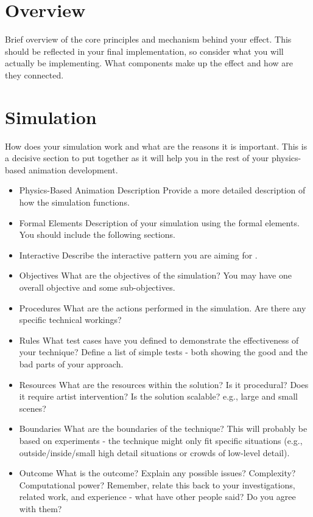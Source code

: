 \documentclass[conference]{acmsiggraph}
\begin{document}
\section{Overview}
Brief overview of the core principles and mechanism behind your effect.  This should be reflected in your final implementation, so consider what you will actually be implementing. What components make up the effect and how are they connected.


\section{Simulation}

How does your simulation work and what are the reasons it is important.  This is a decisive section to put together as it will help you in the rest of your physics-based animation development.

\begin{itemize}
\item{Physics-Based Animation Description}
Provide a more detailed description of how the simulation functions.
\item{Formal Elements}
Description of your simulation using the formal elements.  You should include the following sections.
\item{Interactive}
Describe the interactive pattern you are aiming for .
\item{Objectives}
What are the objectives of the simulation?  You may have one overall objective and some sub-objectives.
\item{Procedures}
What are the actions performed in the simulation.  Are there any specific technical workings?
\item{Rules}
What test cases have you defined to demonstrate the effectiveness of your technique?  Define a list of simple tests - both showing the good and the bad parts of your approach.
\item{Resources}
What are the resources within the solution?  Is it procedural?  Does it require artist intervention?  Is the solution scalable?  e.g., large and small scenes?
\item{Boundaries}
What are the boundaries of the technique?  This will probably be based on experiments - the technique might only fit specific situations (e.g., outside/inside/small high detail situations or crowds of low-level detail).
\item{Outcome}
What is the outcome?  Explain any possible issues?  Complexity? Computational power? Remember, relate this back to your investigations, related work, and experience - what have other people said?  Do you agree with them?
\end{itemize}
\end{document}

